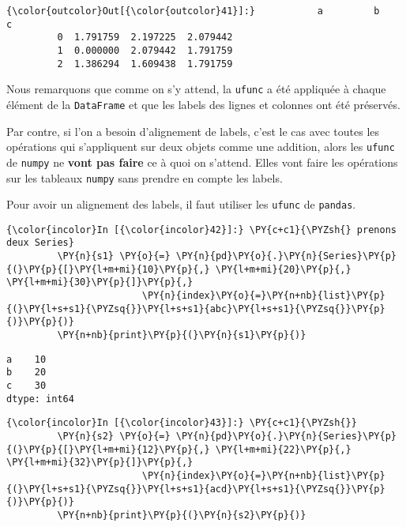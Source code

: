 \begin{Verbatim}[commandchars=\\\{\},frame=single,framerule=0.3mm,rulecolor=\color{cellframecolor}]
{\color{outcolor}Out[{\color{outcolor}41}]:}           a         b         c
         0  1.791759  2.197225  2.079442
         1  0.000000  2.079442  1.791759
         2  1.386294  1.609438  1.791759
\end{Verbatim}
            
    Nous remarquons que comme on s'y attend, la \texttt{ufunc} a été
appliquée à chaque élément de la \texttt{DataFrame} et que les labels
des lignes et colonnes ont été préservés.

    Par contre, si l'on a besoin d'alignement de labels, c'est le cas avec
toutes les opérations qui s'appliquent sur deux objets comme une
addition, alors les \texttt{ufunc} de \texttt{numpy} ne \textbf{vont pas
faire} ce à quoi on s'attend. Elles vont faire les opérations sur les
tableaux \texttt{numpy} sans prendre en compte les labels.

Pour avoir un alignement des labels, il faut utiliser les \texttt{ufunc}
de \texttt{pandas}.

    \begin{Verbatim}[commandchars=\\\{\},frame=single,framerule=0.3mm,rulecolor=\color{cellframecolor}]
{\color{incolor}In [{\color{incolor}42}]:} \PY{c+c1}{\PYZsh{} prenons deux Series}
         \PY{n}{s1} \PY{o}{=} \PY{n}{pd}\PY{o}{.}\PY{n}{Series}\PY{p}{(}\PY{p}{[}\PY{l+m+mi}{10}\PY{p}{,} \PY{l+m+mi}{20}\PY{p}{,} \PY{l+m+mi}{30}\PY{p}{]}\PY{p}{,}
                        \PY{n}{index}\PY{o}{=}\PY{n+nb}{list}\PY{p}{(}\PY{l+s+s1}{\PYZsq{}}\PY{l+s+s1}{abc}\PY{l+s+s1}{\PYZsq{}}\PY{p}{)}\PY{p}{)}
         \PY{n+nb}{print}\PY{p}{(}\PY{n}{s1}\PY{p}{)}
\end{Verbatim}


    \begin{Verbatim}[commandchars=\\\{\},frame=single,framerule=0.3mm,rulecolor=\color{cellframecolor}]
a    10
b    20
c    30
dtype: int64
\end{Verbatim}

    \begin{Verbatim}[commandchars=\\\{\},frame=single,framerule=0.3mm,rulecolor=\color{cellframecolor}]
{\color{incolor}In [{\color{incolor}43}]:} \PY{c+c1}{\PYZsh{}}
         \PY{n}{s2} \PY{o}{=} \PY{n}{pd}\PY{o}{.}\PY{n}{Series}\PY{p}{(}\PY{p}{[}\PY{l+m+mi}{12}\PY{p}{,} \PY{l+m+mi}{22}\PY{p}{,} \PY{l+m+mi}{32}\PY{p}{]}\PY{p}{,}
                        \PY{n}{index}\PY{o}{=}\PY{n+nb}{list}\PY{p}{(}\PY{l+s+s1}{\PYZsq{}}\PY{l+s+s1}{acd}\PY{l+s+s1}{\PYZsq{}}\PY{p}{)}\PY{p}{)}
         \PY{n+nb}{print}\PY{p}{(}\PY{n}{s2}\PY{p}{)}
\end{Verbatim}



